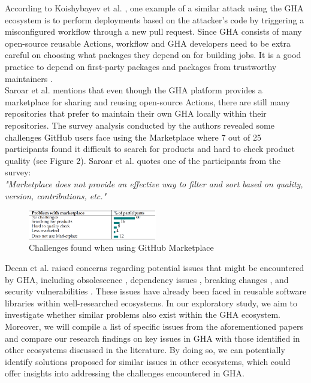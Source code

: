 \documentclass[conference]{IEEEtran}
\begin{document}
        According to Koishybayev et al. \cite{koishybayev2022characterizing}, one example of a similar attack using the GHA ecosystem is to perform deployments based on the attacker’s code by triggering a misconfigured workflow through a new pull request. Since GHA consists of many open-source reusable Actions, workflow and GHA developers need to be extra careful on choosing what packages they depend on for building jobs. It is a good practice to depend on first-party packages and packages from trustworthy maintainers \cite{zimmermann2019small}. \\

        Saroar et al. \cite{saroar2023developers} mentions that even though the GHA platform provides a marketplace for sharing and reusing open-source Actions, there are still many repositories that prefer to maintain their own GHA locally within their repositories. The survey analysis conducted by the authors revealed some challenges GitHub users face using the Marketplace where 7 out of 25 participants found it difficult to search for products and hard to check product quality (see Figure 2). Saroar et al. \cite{saroar2023developers} quotes one of the participants from the survey: \\

\textit{"Marketplace does not provide an effective way to filter and sort based on quality, version, contributions, etc."}\\

\begin{figure} [h]
\includegraphics[width=0.5\textwidth]{Table 1.png}
\caption{Challenges found when using GitHub Marketplace \cite{saroar2023developers} }
\end{figure}

	Decan et al. \cite{decan2022use} raised concerns regarding potential issues that might be encountered by GHA, including obsolescence \cite{decan2018evolution} \cite{cogo2021deprecation}, dependency issues \cite{decan2019empirical} \cite{soto2021comprehensive} \cite{decan2019package}, breaking changes \cite{dietrich2019dependency} \cite{decan2018impact}, and security vulnerabilities \cite{zimmermann2019small} \cite{kula2018developers}. These issues have already been faced in reusable software libraries within well-researched ecosystems. In our exploratory study, we aim to investigate whether similar problems also exist within the GHA ecosystem. Moreover, we will compile a list of specific issues from the aforementioned papers and compare our research findings on key issues in GHA with those identified in other ecosystems discussed in the literature. By doing so, we can potentially identify solutions proposed for similar issues in other ecosystems, which could offer insights into addressing the challenges encountered in GHA.\\
\end{document}
